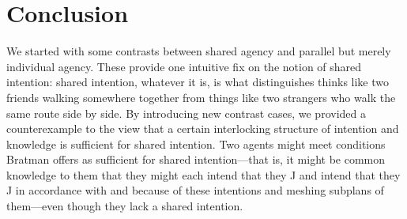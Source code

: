 \documentclass[12pt,\papersize]{extarticle}
\begin{document}
%	
%	
%
%
%
%
%

%
%
%


\section{Conclusion}
We started with some contrasts between shared agency and parallel but merely individual agency.
These provide one intuitive fix on the notion of shared intention: 
 shared intention, whatever it is, is what distinguishes thinks like two friends walking somewhere together from things like two strangers who walk the same route side by side.
By introducing new contrast cases,
we provided a counterexample to the view that a certain interlocking structure of intention and knowledge is sufficient for shared intention. 
Two agents might meet conditions
Bratman offers as sufficient for shared intention---that is, it might be common knowledge to them that they might each intend that they J and intend that they J in accordance with and because of these intentions and meshing subplans of them---even though they lack a shared intention.
\end{document}
